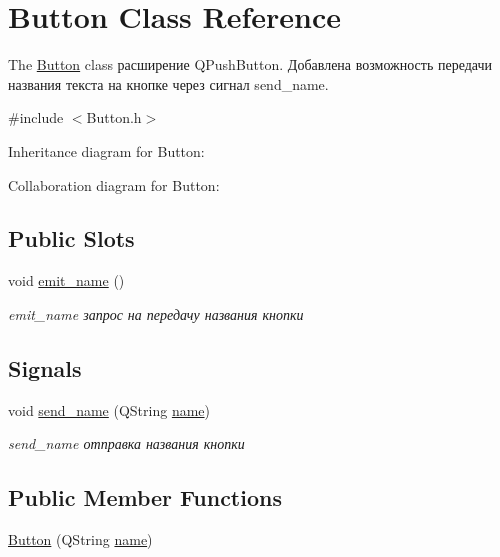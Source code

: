 \hypertarget{classButton}{}\section{Button Class Reference}
\label{classButton}


The \hyperlink{classButton}{Button} class расширение Q\+Push\+Button. Добавлена возможность передачи названия текста на кнопке через сигнал send\+\_\+name.  




{\ttfamily \#include $<$Button.\+h$>$}



Inheritance diagram for Button\+:


Collaboration diagram for Button\+:
\subsection*{Public Slots}
\begin{DoxyCompactItemize}
\item 
void \hyperlink{classButton_a337d0358a39920f2d5843412350e1c1f}{emit\+\_\+name} ()
\begin{DoxyCompactList}\small\item\em emit\+\_\+name запрос на передачу названия кнопки \end{DoxyCompactList}\end{DoxyCompactItemize}
\subsection*{Signals}
\begin{DoxyCompactItemize}
\item 
void \hyperlink{classButton_aaf8fb3a45de5e6b6eba4741ad4d629ff}{send\+\_\+name} (Q\+String \hyperlink{classButton_ac1343196c45cdd97326986d07f4f92e6}{name})
\begin{DoxyCompactList}\small\item\em send\+\_\+name отправка названия кнопки \end{DoxyCompactList}\end{DoxyCompactItemize}
\subsection*{Public Member Functions}
\begin{DoxyCompactItemize}
\item 
\hyperlink{classButton_ac91b269c3d8d22141ff425892813e82d}{Button} (Q\+String \hyperlink{classButton_ac1343196c45cdd97326986d07f4f92e6}{name})
\end{DoxyCompactItemize}
